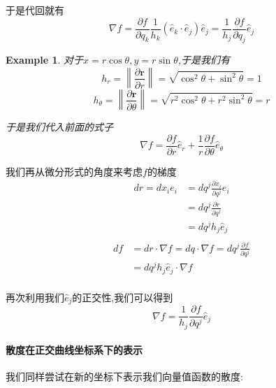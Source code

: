 \documentclass[11pt,hyperref,a4paper,UTF8]{ctexart}
\newtheorem{lemma}{Lemma}[subsection]
\newtheorem{example}{Example}[subsection]
\newcommand{\parameter}[1]{\left(#1\right)}
\newcommand{\ve}{\boldsymbol}
\begin{document}
\begin{CJK}{UTF8}{gkai}
于是代回就有
\[\nabla f = \frac{\partial f}{\partial q_k} \frac{1}{h_k}(\hat{e}_k \cdot \hat{e}_j) \hat{e}_j = \frac{1}{h_j} \frac{\partial f}{\partial q_j} \hat{e}_j\]


\begin{example}
  对于$x = r\cos \theta,y = r\sin\theta$,于是我们有
  \[h_r = \left\|\frac{\partial \ve{r}}{\partial r}\right\| = \sqrt{\cos^2\theta + \sin^2\theta} = 1\]
  \[h_\theta = \left\|\frac{\partial \ve{r}}{\partial \theta}\right\| = \sqrt{r^2\cos^2\theta + r^2 \sin^2 \theta} = r\]

  于是我们代入前面的式子
  \[\nabla f = \frac{\partial f}{\partial r} \hat{e}_r + \frac{1}{r}\frac{\partial f}{\partial \theta} \hat{e}_\theta\]
\end{example}

我们再从微分形式的角度来考虑$f$的梯度
\[
\begin{aligned}
  dr = dx_i e_i &= dq^j \frac{\partial x_i}{\partial q^j} e_i\\
  &= dq^j \frac{\partial r}{\partial q^j}\\
  &= dq^j h_j \hat{e}_j\\
  \end{aligned}
\]
\[
\begin{aligned}  
df &= dr \cdot \nabla f = dq \cdot \nabla f = dq^j \frac{\partial f}{\partial q^j}\\
&= dq^j h_j \hat{e}_j \cdot \nabla f\\
\end{aligned}
\]

再次利用我们$\hat{e}_j$的正交性,我们可以得到
\[\nabla f = \frac{1}{h_j} \frac{\partial f}{\partial q^j}\hat{e}_j\]

\paragraph{散度在正交曲线坐标系下的表示\\}
我们同样尝试在新的坐标下表示我们向量值函数的散度:



\end{CJK}
\end{document}
